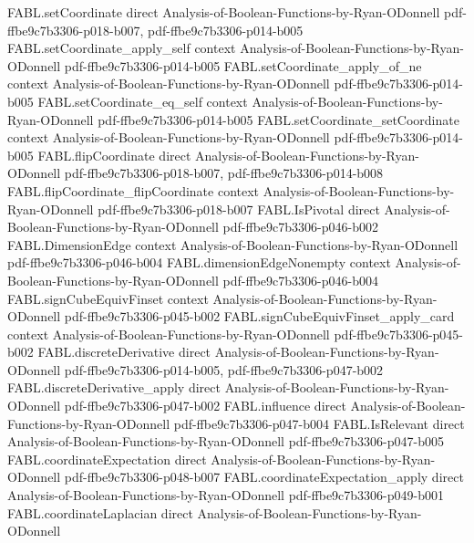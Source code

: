 \begin{theorem}
\proofstep
  {FABL.setCoordinate}
  {direct}
  {Analysis-of-Boolean-Functions-by-Ryan-ODonnell}
  {pdf-ffbe9c7b3306-p018-b007,
    pdf-ffbe9c7b3306-p014-b005}
\proofstep
  {FABL.setCoordinate_apply_self}
  {context}
  {Analysis-of-Boolean-Functions-by-Ryan-ODonnell}
  {pdf-ffbe9c7b3306-p014-b005}
\proofstep
  {FABL.setCoordinate_apply_of_ne}
  {context}
  {Analysis-of-Boolean-Functions-by-Ryan-ODonnell}
  {pdf-ffbe9c7b3306-p014-b005}
\proofstep
  {FABL.setCoordinate_eq_self}
  {context}
  {Analysis-of-Boolean-Functions-by-Ryan-ODonnell}
  {pdf-ffbe9c7b3306-p014-b005}
\proofstep
  {FABL.setCoordinate_setCoordinate}
  {context}
  {Analysis-of-Boolean-Functions-by-Ryan-ODonnell}
  {pdf-ffbe9c7b3306-p014-b005}
\proofstep
  {FABL.flipCoordinate}
  {direct}
  {Analysis-of-Boolean-Functions-by-Ryan-ODonnell}
  {pdf-ffbe9c7b3306-p018-b007,
    pdf-ffbe9c7b3306-p014-b008}
\proofstep
  {FABL.flipCoordinate_flipCoordinate}
  {context}
  {Analysis-of-Boolean-Functions-by-Ryan-ODonnell}
  {pdf-ffbe9c7b3306-p018-b007}
\proofstep
  {FABL.IsPivotal}
  {direct}
  {Analysis-of-Boolean-Functions-by-Ryan-ODonnell}
  {pdf-ffbe9c7b3306-p046-b002}
\proofstep
  {FABL.DimensionEdge}
  {context}
  {Analysis-of-Boolean-Functions-by-Ryan-ODonnell}
  {pdf-ffbe9c7b3306-p046-b004}
\proofstep
  {FABL.dimensionEdgeNonempty}
  {context}
  {Analysis-of-Boolean-Functions-by-Ryan-ODonnell}
  {pdf-ffbe9c7b3306-p046-b004}
\proofstep
  {FABL.signCubeEquivFinset}
  {context}
  {Analysis-of-Boolean-Functions-by-Ryan-ODonnell}
  {pdf-ffbe9c7b3306-p045-b002}
\proofstep
  {FABL.signCubeEquivFinset_apply_card}
  {context}
  {Analysis-of-Boolean-Functions-by-Ryan-ODonnell}
  {pdf-ffbe9c7b3306-p045-b002}
\proofstep
  {FABL.discreteDerivative}
  {direct}
  {Analysis-of-Boolean-Functions-by-Ryan-ODonnell}
  {pdf-ffbe9c7b3306-p014-b005,
    pdf-ffbe9c7b3306-p047-b002}
\proofstep
  {FABL.discreteDerivative_apply}
  {direct}
  {Analysis-of-Boolean-Functions-by-Ryan-ODonnell}
  {pdf-ffbe9c7b3306-p047-b002}
\proofstep
  {FABL.influence}
  {direct}
  {Analysis-of-Boolean-Functions-by-Ryan-ODonnell}
  {pdf-ffbe9c7b3306-p047-b004}
\proofstep
  {FABL.IsRelevant}
  {direct}
  {Analysis-of-Boolean-Functions-by-Ryan-ODonnell}
  {pdf-ffbe9c7b3306-p047-b005}
\proofstep
  {FABL.coordinateExpectation}
  {direct}
  {Analysis-of-Boolean-Functions-by-Ryan-ODonnell}
  {pdf-ffbe9c7b3306-p048-b007}
\proofstep
  {FABL.coordinateExpectation_apply}
  {direct}
  {Analysis-of-Boolean-Functions-by-Ryan-ODonnell}
  {pdf-ffbe9c7b3306-p049-b001}
\proofstep
  {FABL.coordinateLaplacian}
  {direct}
  {Analysis-of-Boolean-Functions-by-Ryan-ODonnell}

\end{theorem}
